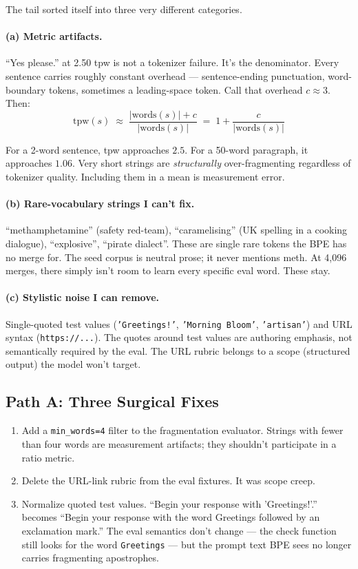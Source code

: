 The tail sorted itself into three very different categories.

\paragraph{(a) Metric artifacts.} ``Yes please.'' at 2.50 tpw is not a
tokenizer failure. It's the denominator. Every sentence carries roughly
constant overhead --- sentence-ending punctuation, word-boundary tokens,
sometimes a leading-space token. Call that overhead $c \approx 3$. Then:
\[
    \text{tpw}(s) \;\approx\; \frac{|\text{words}(s)| + c}{|\text{words}(s)|}
    \;=\; 1 + \frac{c}{|\text{words}(s)|}
\]

For a 2-word sentence, tpw approaches $2.5$. For a 50-word paragraph, it
approaches $1.06$. Very short strings are \textit{structurally}
over-fragmenting regardless of tokenizer quality. Including them in a mean
is measurement error.

\paragraph{(b) Rare-vocabulary strings I can't fix.} ``methamphetamine''
(safety red-team), ``caramelising'' (UK spelling in a cooking dialogue),
``explosive'', ``pirate dialect''. These are single rare tokens the BPE
has no merge for. The seed corpus is neutral prose; it never mentions
meth. At 4{,}096 merges, there simply isn't room to learn every specific
eval word. These stay.

\paragraph{(c) Stylistic noise I can remove.} Single-quoted test values
(\texttt{'Greetings!'}, \texttt{'Morning Bloom'}, \texttt{'artisan'}) and
URL syntax (\texttt{https://...}). The quotes around test values are
authoring emphasis, not semantically required by the eval. The URL rubric
belongs to a scope (structured output) the model won't target.

\subsection*{Path A: Three Surgical Fixes}

\begin{enumerate}
    \item Add a \texttt{min\_words=4} filter to the fragmentation evaluator.
          Strings with fewer than four words are measurement artifacts; they
          shouldn't participate in a ratio metric.
    \item Delete the URL-link rubric from the eval fixtures. It was scope
          creep.
    \item Normalize quoted test values. ``Begin your response with
          'Greetings!'.'' becomes ``Begin your response with the word
          Greetings followed by an exclamation mark.'' The eval semantics
          don't change --- the check function still looks for the word
          \texttt{Greetings} --- but the prompt text BPE sees no longer
          carries fragmenting apostrophes.
\end{enumerate}

